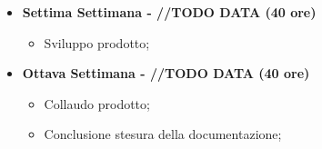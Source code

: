 {\begin{itemize}
\begin{itemize}
        \end{itemize}
        \item \textbf{Settima Settimana - //TODO DATA (40 ore)} 
        \begin{itemize}
            \item Sviluppo prodotto;
        \end{itemize}
        \item \textbf{Ottava Settimana - //TODO DATA (40 ore)} 
        \begin{itemize}
            \item Collaudo prodotto;
            \item Conclusione stesura della documentazione;
        \end{itemize}
    \end{itemize}
}

\newcommand{\totaleOre}{305}

\newcommand{\obiettiviObbligatori}{
	 \item \underline{\textit{O01}}: visualizzazione interattiva volumetrica;
	 \item \underline{\textit{O02}}: possibilità di scelta della funzione di trasferimento dei voxel (colore, trasparenza);
	 
}

\newcommand{\obiettiviDesiderabili}{
	 \item \underline{\textit{D01}}: piani di taglio del volume;
	 \item \underline{\textit{D02}}: modifiche alla funzione taglio;
	 \item \underline{\textit{D03}}: ottimizzazione rendering GPU;
}

\newcommand{\obiettiviFacoltativi}{
	 \item \underline{\textit{F01}}: algoritmi di segmentazione con ITK;
	 \item \underline{\textit{F02}}: analisi unit-testing su GUI-Qt;
	 \item \underline{\textit{F03}}: porting librerie aziendali su CMake;
}
